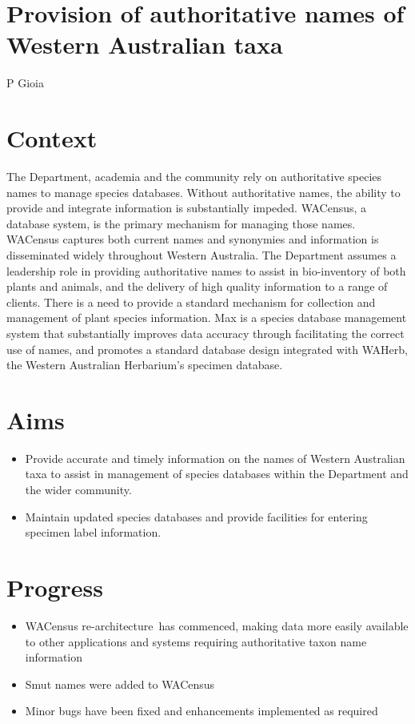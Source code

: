 \documentclass[version=last,
    paper=a4, %
    10pt, %
    usenames,
    dvipsnames,
    oneside, %
    headings=openany, %
    DIV=15 %
]{scrbook}
\begin{document}
\section*{Provision of authoritative names of Western Australian taxa
}

P Gioia


\section*{Context}
The Department, academia and the community rely on authoritative species
names to manage species databases. Without authoritative names, the
ability to provide and integrate information is substantially impeded.
WACensus, a database system, is the primary mechanism for managing those
names. WACensus captures both current names and synonymies and
information is disseminated widely throughout Western Australia. The
Department assumes a leadership role in providing authoritative names to
assist in bio-inventory of both plants and animals, and the delivery of
high quality information to a range of clients. There is a need to
provide a standard mechanism for collection and management of plant
species information. Max is a species database management system that
substantially improves data accuracy through facilitating the correct
use of names, and promotes a standard database design integrated with
WAHerb, the Western Australian Herbarium's specimen database.



\section*{Aims}
\begin{itemize}
\itemsep1pt\parskip0pt
\item
  Provide accurate and timely information on the names of Western
  Australian taxa to assist in management of species databases within
  the Department and the wider community.
\item
  Maintain updated species databases and provide facilities for entering
  specimen label information.
\end{itemize}



\section*{Progress}
\begin{itemize}
\itemsep1pt\parskip0pt
\item
  WACensus re-architecture~has commenced, making data more easily
  available to other applications and systems requiring authoritative
  taxon name information
\item
  Smut names were added to WACensus
\item
  Minor bugs have been fixed and enhancements implemented as required
\end{itemize}
\end{document}
